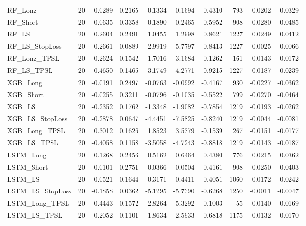 \begin{tabular}{llrrrrrrrr}
\cline{1-10}
RF\_Long & 20 & -0.0289 & 0.2165 & -0.1334 & -0.1694 & -0.4310 & 793 & -0.0202 & -0.0329 \\
\cline{1-10}
RF\_Short & 20 & -0.0635 & 0.3358 & -0.1890 & -0.2465 & -0.5952 & 908 & -0.0280 & -0.0485 \\
\cline{1-10}
RF\_LS & 20 & -0.2604 & 0.2491 & -1.0455 & -1.2998 & -0.8621 & 1227 & -0.0249 & -0.0412 \\
\cline{1-10}
RF\_LS\_StopLoss & 20 & -0.2661 & 0.0889 & -2.9919 & -5.7797 & -0.8413 & 1227 & -0.0025 & -0.0066 \\
\cline{1-10}
RF\_Long\_TPSL & 20 & 0.2624 & 0.1542 & 1.7016 & 3.1684 & -0.1262 & 161 & -0.0143 & -0.0172 \\
\cline{1-10}
RF\_LS\_TPSL & 20 & -0.4650 & 0.1465 & -3.1749 & -4.2771 & -0.9215 & 1227 & -0.0187 & -0.0239 \\
\cline{1-10}
XGB\_Long & 20 & -0.0191 & 0.2497 & -0.0763 & -0.0992 & -0.4167 & 930 & -0.0227 & -0.0362 \\
\cline{1-10}
XGB\_Short & 20 & -0.0255 & 0.3211 & -0.0796 & -0.1035 & -0.5522 & 799 & -0.0270 & -0.0464 \\
\cline{1-10}
XGB\_LS & 20 & -0.2352 & 0.1762 & -1.3348 & -1.9082 & -0.7854 & 1219 & -0.0193 & -0.0262 \\
\cline{1-10}
XGB\_LS\_StopLoss & 20 & -0.2878 & 0.0647 & -4.4451 & -7.5825 & -0.8240 & 1219 & -0.0044 & -0.0081 \\
\cline{1-10}
XGB\_Long\_TPSL & 20 & 0.3012 & 0.1626 & 1.8523 & 3.5379 & -0.1539 & 267 & -0.0151 & -0.0177 \\
\cline{1-10}
XGB\_LS\_TPSL & 20 & -0.4058 & 0.1158 & -3.5058 & -4.7243 & -0.8818 & 1219 & -0.0143 & -0.0187 \\
\cline{1-10}
LSTM\_Long & 20 & 0.1268 & 0.2456 & 0.5162 & 0.6464 & -0.4380 & 776 & -0.0215 & -0.0362 \\
\cline{1-10}
LSTM\_Short & 20 & -0.0101 & 0.2751 & -0.0366 & -0.0504 & -0.4161 & 908 & -0.0250 & -0.0403 \\
\cline{1-10}
LSTM\_LS & 20 & -0.0521 & 0.1644 & -0.3171 & -0.4411 & -0.4051 & 1060 & -0.0172 & -0.0242 \\
\cline{1-10}
LSTM\_LS\_StopLoss & 20 & -0.1858 & 0.0362 & -5.1295 & -5.7390 & -0.6268 & 1250 & -0.0011 & -0.0047 \\
\cline{1-10}
LSTM\_Long\_TPSL & 20 & 0.4443 & 0.1572 & 2.8264 & 5.3292 & -0.1003 & 55 & -0.0140 & -0.0169 \\
\cline{1-10}
LSTM\_LS\_TPSL & 20 & -0.2052 & 0.1101 & -1.8634 & -2.5933 & -0.6818 & 1175 & -0.0132 & -0.0170 \\
\cline{1-10}
\bottomrule
\end{tabular}
